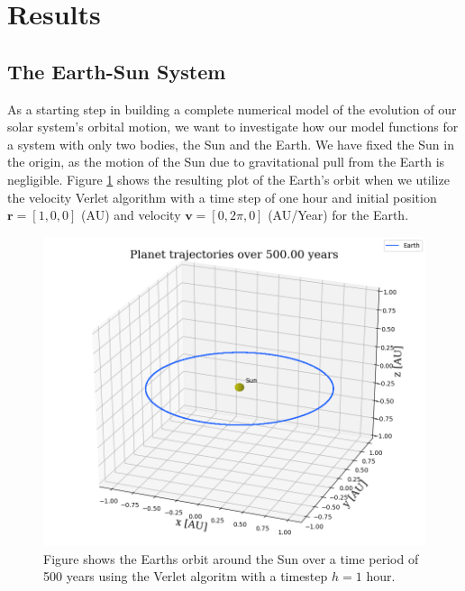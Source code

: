 \documentclass[12pt]{article}
\numberwithin{figure}{section}
\numberwithin{table}{section}
\begin{document}
\section{Results} \label{sec:results}


\subsection{The Earth-Sun System} \label{sec:results_earth_sun}

\noindent As a starting step in building a complete numerical model of the evolution of our solar system's orbital motion, we want to investigate how our model functions for a system with only two bodies, the Sun and the Earth. We have fixed the Sun in the origin, as the motion of the Sun due to gravitational pull from the Earth is negligible. Figure \ref{fig:circular plot} shows the resulting plot of the Earth's orbit when we utilize the velocity Verlet algorithm with a time step of one hour and initial position $\mathbf{r} = [1, 0, 0]$ (AU) and velocity $\mathbf{v} = [0, 2\pi, 0]$ (AU/Year) for the Earth. \\


\begin{figure}[ht]
 \centerline{\includegraphics[scale = 0.6]{earth_sun_circular_3D.png}}
 \caption{Figure shows the Earths orbit around the Sun over a time period of 500 years using the Verlet algoritm with a timestep $h=1$ hour.}
 \label{fig:circular plot}
\end{figure}
\end{document}
